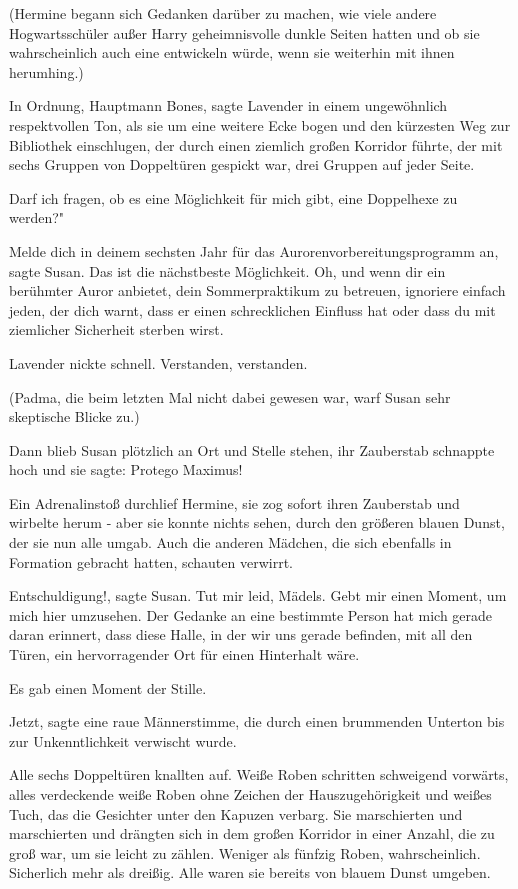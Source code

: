 (Hermine begann sich Gedanken darüber zu machen, wie viele andere
Hogwartsschüler außer Harry geheimnisvolle dunkle Seiten hatten und ob sie
wahrscheinlich auch eine entwickeln würde, wenn sie weiterhin mit ihnen
herumhing.)

\glqq In Ordnung, Hauptmann Bones\grqq{}, sagte Lavender in einem ungewöhnlich
respektvollen Ton, als sie um eine weitere Ecke bogen und den kürzesten Weg zur
Bibliothek einschlugen, der durch einen ziemlich großen Korridor führte, der mit
sechs Gruppen von Doppeltüren gespickt war, drei Gruppen auf jeder Seite.

\glqq Darf ich fragen, ob es eine Möglichkeit für mich gibt, eine Doppelhexe zu
werden?"

\glqq Melde dich in deinem sechsten Jahr für das Aurorenvorbereitungsprogramm
an\grqq{}, sagte Susan. \glqq Das ist die nächstbeste Möglichkeit. Oh, und wenn
dir ein berühmter Auror anbietet, dein Sommerpraktikum zu betreuen, ignoriere
einfach jeden, der dich warnt, dass er einen schrecklichen Einfluss hat oder
dass du mit ziemlicher Sicherheit sterben wirst.\grqq{}

Lavender nickte schnell. \glqq Verstanden, verstanden.\grqq{}

(Padma, die beim letzten Mal nicht dabei gewesen war, warf Susan sehr skeptische
Blicke zu.)

Dann blieb Susan plötzlich an Ort und Stelle stehen, ihr Zauberstab schnappte
hoch und sie sagte: \glqq Protego Maximus!\grqq{}

Ein Adrenalinstoß durchlief Hermine, sie zog sofort ihren Zauberstab und
wirbelte herum - aber sie konnte nichts sehen, durch den größeren blauen Dunst,
der sie nun alle umgab. Auch die anderen Mädchen, die sich ebenfalls in
Formation gebracht hatten, schauten verwirrt.

\glqq Entschuldigung!\grqq{}, sagte Susan. \glqq Tut mir leid, Mädels. Gebt mir
einen Moment, um mich hier umzusehen. Der Gedanke an eine bestimmte Person hat
mich gerade daran erinnert, dass diese Halle, in der wir uns gerade befinden,
mit all den Türen, ein hervorragender Ort für einen Hinterhalt wäre.\grqq{}

Es gab einen Moment der Stille.

\glqq Jetzt\grqq{}, sagte eine raue Männerstimme, die durch einen brummenden
Unterton bis zur Unkenntlichkeit verwischt wurde.

Alle sechs Doppeltüren knallten auf. Weiße Roben schritten schweigend vorwärts,
alles verdeckende weiße Roben ohne Zeichen der Hauszugehörigkeit und weißes
Tuch, das die Gesichter unter den Kapuzen verbarg. Sie marschierten und
marschierten und drängten sich in dem großen Korridor in einer Anzahl, die zu
groß war, um sie leicht zu zählen. Weniger als fünfzig Roben, wahrscheinlich.
Sicherlich mehr als dreißig. Alle waren sie bereits von blauem Dunst umgeben.

